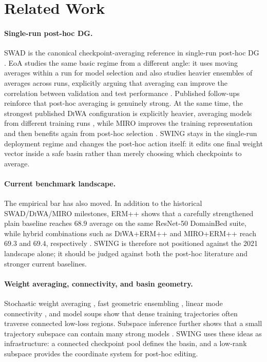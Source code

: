 \documentclass{article}
\newcommand{\swing}{\textup{\textsc{SWING}}}
\newcommand{\swad}{\textup{\textsc{SWAD}}}
\newcommand{\diwa}{\textup{\textsc{DiWA}}}
\newcommand{\miro}{\textup{\textsc{MIRO}}}
\begin{document}
\section{Related Work}

\paragraph{Single-run post-hoc DG.}
\swad{} is the canonical checkpoint-averaging reference in single-run post-hoc DG \citep{cha2021swad}. EoA studies the same basic regime from a different angle: it uses moving averages within a run for model selection and also studies heavier ensembles of averages across runs, explicitly arguing that averaging can improve the correlation between validation and test performance \citep{arpit2022eoa}. Published follow-ups reinforce that post-hoc averaging is genuinely strong. At the same time, the strongest published \diwa{} configuration is explicitly heavier, averaging models from different training runs \citep{rame2022diwa}, while \miro{} improves the training representation and then benefits again from post-hoc selection \citep{cha2022miro}. \swing{} stays in the single-run deployment regime and changes the post-hoc action itself: it edits one final weight vector inside a safe basin rather than merely choosing which checkpoints to average.

\paragraph{Current benchmark landscape.}
The empirical bar has also moved. In addition to the historical \swad{}/\diwa{}/\miro{} milestones, \textsc{ERM++} shows that a carefully strengthened plain baseline reaches \(68.9\) average on the same ResNet-50 DomainBed suite, while hybrid combinations such as \diwa{}+\textsc{ERM++} and \miro{}+\textsc{ERM++} reach \(69.3\) and \(69.4\), respectively \citep{teterwak2025ermpp}. \swing{} is therefore not positioned against the 2021 landscape alone; it should be judged against both the post-hoc literature and stronger current baselines.

\paragraph{Weight averaging, connectivity, and basin geometry.}
Stochastic weight averaging \citep{izmailov2018swa}, fast geometric ensembling \citep{garipov2018fge}, linear mode connectivity \citep{frankle2020linear}, and model soups \citep{wortsman2022soups} show that dense training trajectories often traverse connected low-loss regions. Subspace inference further shows that a small trajectory subspace can contain many strong models \citep{izmailov2020subspace}. \swing{} uses these ideas as infrastructure: a connected checkpoint pool defines the basin, and a low-rank subspace provides the coordinate system for post-hoc editing.
\end{document}
